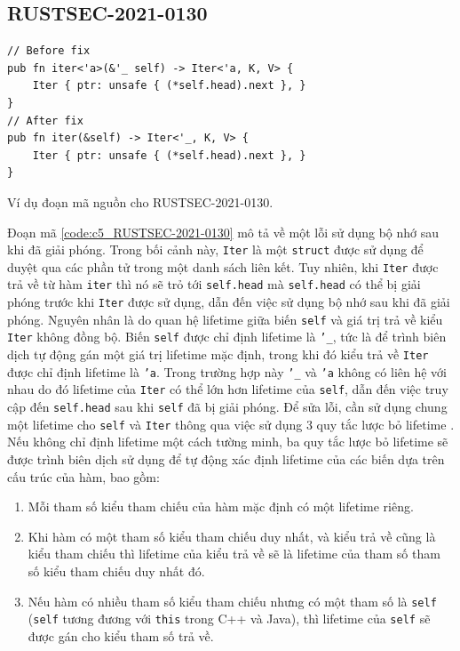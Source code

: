 \subsection{RUSTSEC-2021-0130}

\begin{listing}[H]
\begin{verbatim}
// Before fix
pub fn iter<'a>(&'_ self) -> Iter<'a, K, V> {
    Iter { ptr: unsafe { (*self.head).next }, }
}
// After fix
pub fn iter(&self) -> Iter<'_, K, V> {
    Iter { ptr: unsafe { (*self.head).next }, }
}
\end{verbatim}
\caption{Ví dụ đoạn mã nguồn cho RUSTSEC-2021-0130.}
\label{code:c5_RUSTSEC-2021-0130}
\end{listing}


Đoạn mã \ref{code:c5_RUSTSEC-2021-0130} mô tả về một lỗi sử dụng bộ nhớ sau khi đã giải phóng.
Trong bối cảnh này, \texttt{Iter} là một \texttt{struct} được sử dụng để duyệt qua các phần tử trong một danh sách liên kết.
Tuy nhiên, khi \texttt{Iter} được trả về từ hàm \texttt{iter} thì nó sẽ trỏ tới \texttt{self.head} mà \texttt{self.head} có thể bị giải phóng trước khi \texttt{Iter} được sử dụng, dẫn đến việc sử dụng bộ nhớ sau khi đã giải phóng.
Nguyên nhân là do quan hệ lifetime giữa biến \texttt{self} và giá trị trả về kiểu \texttt{Iter} không đồng bộ.
Biến \texttt{self} được chỉ định lifetime là \texttt{'\_}, tức là để trình biên dịch tự động gán một giá trị lifetime mặc định, trong khi đó kiểu trả về \texttt{Iter} được chỉ định lifetime là \texttt{'a}.
Trong trường hợp này \texttt{'\_} và \texttt{'a} không có liên hệ với nhau do đó lifetime của \texttt{Iter} có thể lớn hơn lifetime của \texttt{self}, dẫn đến việc truy cập đến \texttt{self.head} sau khi \texttt{self} đã bị giải phóng.
Để sửa lỗi, cần sử dụng chung một lifetime cho \texttt{self} và \texttt{Iter} thông qua việc sử dụng 3 quy tắc lược bỏ lifetime \cite{rustlangLifetimeElision}.
Nếu không chỉ định lifetime một cách tường minh, ba quy tắc lược bỏ lifetime sẽ được trình biên dịch sử dụng để tự động xác định lifetime của các biến dựa trên cấu trúc của hàm, bao gồm:

\begin{enumerate}
    \item Mỗi tham số kiểu tham chiếu của hàm mặc định có một lifetime riêng.
    \item Khi hàm có một tham số kiểu tham chiếu duy nhất, và kiểu trả về cũng là kiểu tham chiếu thì lifetime của kiểu trả về sẽ là lifetime của tham số tham số kiểu tham chiếu duy nhất đó.
    \item Nếu hàm có nhiều tham số kiểu tham chiếu nhưng có một tham số là \texttt{self} (\texttt{self} tương đương với \texttt{this} trong C++ và Java), thì lifetime của \texttt{self} sẽ được gán cho kiểu tham số trả về.
\end{enumerate}

